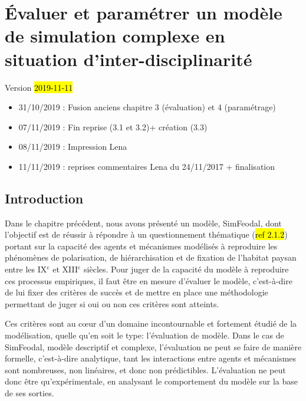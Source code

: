 \chapter{Évaluer et paramétrer un modèle de simulation complexe en situation d'inter-disciplinarité}
\label{chap:chap3}
\begin{center}
{\large Version \hl{2019-11-11}}
\end{center}

\begin{itemize}
	\item 31/10/2019 : Fusion anciens chapitre 3 (évaluation) et 4 (paramétrage)
	\item 07/11/2019 : Fin reprise (3.1 et 3.2)+ création (3.3)
	\item 08/11/2019 : Impression Lena
	\item 11/11/2019 : reprises commentaires Lena du 24/11/2017 + finalisation
\end{itemize}

\setcounter{minitocdepth}{2}

\minitoc
\clearpage

\section*{Introduction}
\label{sec:chap3-4-intro}

Dans le chapitre précédent, nous avons présenté un modèle, SimFeodal, dont l'objectif est de réussir à répondre à un questionnement thématique (\hl{ref 2.1.2}) portant sur la capacité des agents et mécanismes modélisés à reproduire les phénomènes de polarisation, de hiérarchisation et de fixation de l'habitat paysan entre les IX$^e$ et XIII$^e$ siècles.
Pour juger de la capacité du modèle à reproduire ces processus empiriques, il faut être en mesure d'évaluer le modèle, c'est-à-dire de lui fixer des critères de succès et de mettre en place une méthodologie permettant de juger si oui ou non ces critères sont atteints.

Ces critères sont au cœur d'un domaine incontournable et fortement étudié de la modélisation, quelle qu'en soit le type: l'évaluation de modèle.
Dans le cas de SimFeodal, modèle descriptif et complexe, l'évaluation ne peut se faire de manière formelle, c'est-à-dire analytique, tant les interactions entre agents et mécanismes sont nombreuses, non linéaires, et donc non prédictibles.
L'évaluation ne peut donc être qu'expérimentale, en analysant le comportement du modèle sur la base de ses sorties.


